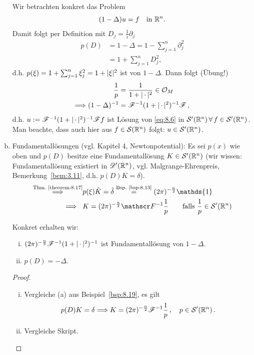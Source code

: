 \begin{bsp}
\begin{enumerate}[(a)]
Wir betrachten konkret das Problem
\begin{align}
\label{eq:8.6}
	(1-\Delta)u = f \quad\text{in }\mathbb{R}^n.
\end{align}
Damit folgt per Definition mit $D_j = \frac 1 i \partial_j$
\begin{align*}
	p(D) &= 1-\Delta = 1-\sum_{j=1}^n \partial_j^2 \\ & = 1+\sum_{j=1}^n D_j^2,
\end{align*}
d.h. $p(\xi) = 1+\sum_{j=1}^n \xi_j^2 = 1+\lvert \xi\rvert^2$ ist  von $1-\Delta$. Dann folgt (Übung!)
\begin{align*}
	\frac 1 p & = \frac 1{1+\lvert \, \cdot\, \rvert^2} \in \mathcal O_M\\
	 \Longrightarrow (1-\Delta)^{-1} &= \mathscr{F}^{-1} (1+\lvert \, \cdot\, \rvert^2)^{-1} \mathscr{F} \, ,
\end{align*}
d.h. $u := \mathscr{F}^{-1} (1+\lvert \, \cdot\, \rvert^2)^{-1} \mathscr{F} f$ ist Lösung von \eqref{eq:8.6} in $\mathcal S'(\mathbb{R}^n) \, \forall \, f \in \mathcal S'(\mathbb{R}^n)$. Man beachte, dass auch hier aus $f \in \mathcal S(\mathbb{R}^n)$ folgt: $u \in \mathcal S'(\mathbb{R}^n)$.
\item Fundamentallösungen (vgl. Kapitel 4, Newtonpotential): Es sei $p(x)$ wie oben und $p(D)$ besitze eine Fundamentallösung $K \in\mathcal S'(\mathbb{R}^n)$ (wir wissen: Fundamentallösung existiert in $\mathscr{D}'(\mathbb{R}^n)$, vgl. Malgrange-Ehrenpreis, Bemerkung~\ref{bem:3.11}, d.h. $p(D)K = \delta$).
\begin{align*}
	\stackrel{\scriptsize\text{Thm.~\ref{theorem:8.17}}}\Ra & p (\xi) \hat K = \hat \delta \stackrel{\scriptsize\text{Bsp.}~\ref{bsp:8.13}}= (2\pi)^{-\frac n2} \mathds{1} \\
	\Ra\,\, \, \  & K = (2\pi)^{-\frac n2} \F^{-1}\frac 1 p \qquad \text{falls } \frac 1 p \in \mathcal S'(\R^n)
\end{align*}

Konkret erhalten wir:
\begin{enumerate}[(i)]
\item $(2\pi)^{-\frac n2} \mathscr{F}^{-1} (1+\lvert \, \cdot \, \rvert^2)^{-1}$ ist Fundamentallösung von $1-\Delta$.
\item $p(D) = -\Delta$.
\end{enumerate}
\begin{proof}
\begin{enumerate}[(i)]
\item Vergleiche (a) aus Beispiel~\ref{bsp:8.19}, es gilt
\[
	p(D) K = \delta \Longrightarrow K = (2\pi)^{-\frac n2} \mathscr{F}^{-1} \frac 1p\, , \quad p \in \mathcal S'(\mathbb{R}^n) \, .
\]
\item Vergleiche Skript.\qedhere
\end{enumerate}
\end{proof}
\end{enumerate}
\end{bsp}



